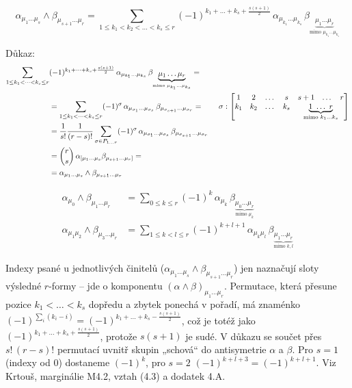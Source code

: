 \begin{veta}[Theorem]
\[
  \alpha_{\mu_1\dots\mu_s}\wedge\beta_{\mu_{s+1}\dots\mu_r} =
  \sum_{1\le k_1<k_2<\dots<k_s\le r}(-1)^{k_1+\dots+k_s+\frac{s(s+1)}{2}}\,
  \alpha_{\mu_{k_1}\dots\mu_{k_s}}\,\beta_{\underbrace{\mu_1\dots\mu_r}_{\text{mimo }\mu_{k_1}\dots\mu_{k_s}}}
\]
\end{veta}
Důkaz:
\begin{align*}
  \sum_{1\le k_1<\dots<k_s\le r}&(-1)^{k_1+\dots+k_s+\frac{s(s+1)}{2}}\,
    \alpha_{\mu_{k_1}\dots\mu_{k_s}}\,\beta_{\underbrace{\mu_1\dots\mu_r}_{\text{mimo }\mu_{k_1}\dots\mu_{k_s}}} = \\
  &= \sum_{1\le k_1<\dots<k_s\le r}(-1)^\sigma\,\alpha_{\mu_{\sigma_1}\dots\mu_{\sigma_s}}\,\beta_{\mu_{\sigma_{s+1}}\dots\mu_{\sigma_r}} =
  \qquad \sigma: \begin{bmatrix} 1 & 2 & \dots & s & s+1 & \dots & r \\
                                k_1 & k_2 & \dots & k_s & \multicolumn{3}{c}{\underbrace{1\ \dots\ r}_{\text{mimo }k_1\dots k_s}} \end{bmatrix} \\
  &= \frac{1}{s!}\frac{1}{(r-s)!}\sum_{\sigma\in P_{1\dots r}}(-1)^\sigma\,\alpha_{\mu_{\sigma_1}\dots\mu_{\sigma_s}}\,\beta_{\mu_{\sigma_{s+1}}\dots\mu_{\sigma_r}} \\
  &= \binom{r}{s}\,\alpha_{[\mu_1\dots\mu_s}\beta_{\mu_{s+1}\dots\mu_r]} = \\
  &= \alpha_{\mu_1\dots\mu_s}\wedge\beta_{\mu_{s+1}\dots\mu_r}
\end{align*}

\begin{veta}[Theorem]
\begin{align*}
  \alpha_{\mu_0}\wedge\beta_{\mu_1\dots\mu_r} &= \sum_{0\le k\le r}(-1)^k\,\alpha_{\mu_k}\,
    \beta_{\underbrace{\mu_0\dots\mu_r}_{\text{mimo }\mu_k}} \\
  \alpha_{\mu_1\mu_2}\wedge\beta_{\mu_3\dots\mu_r} &= \sum_{1\le k<l\le r}(-1)^{k+l+1}\,\alpha_{\mu_k\mu_l}\,
    \beta_{\underbrace{\mu_1\dots\mu_r}_{\text{mimo }k,l}}
\end{align*}
\end{veta}

\begin{vysvetleni}
Indexy psané u jednotlivých činitelů ($\alpha_{\mu_1\dots\mu_s}\wedge\beta_{\mu_{s+1}\dots\mu_r}$) jen naznačují sloty výsledné $r$-formy -- jde o komponentu $(\alpha\wedge\beta)_{\mu_1\dots\mu_r}$.
Permutace, která přesune pozice $k_1<\dots<k_s$ dopředu a zbytek ponechá v pořadí, má znaménko $(-1)^{\sum_i(k_i-i)}=(-1)^{k_1+\dots+k_s-\frac{s(s+1)}2}$, což je totéž jako $(-1)^{k_1+\dots+k_s+\frac{s(s+1)}2}$, protože $s(s+1)$ je sudé. V důkazu se součet přes $s!\,(r-s)!$ permutací uvnitř skupin „schová“ do antisymetrie $\alpha$ a $\beta$.
Pro $s=1$ (indexy od $0$) dostaneme $(-1)^k$, pro $s=2$ $(-1)^{k+l+3}=(-1)^{k+l+1}$. Viz Krtouš, marginálie M4.2, vztah (4.3) a dodatek 4.A.
\end{vysvetleni}

